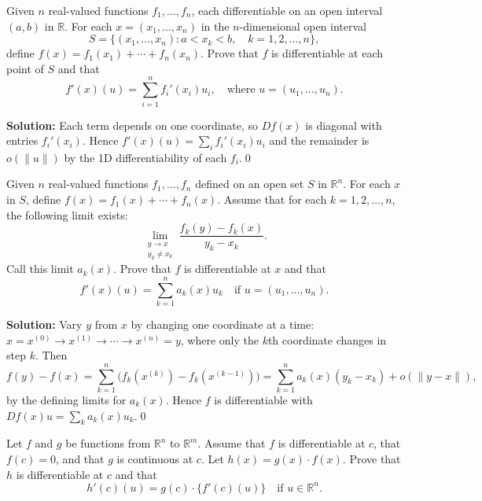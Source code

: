 \begin{problembox}
Given \( n \) real-valued functions \( f_1, \ldots, f_n \), each differentiable on an open interval \( (a, b) \) in \( \mathbb{R} \). For each \( x = (x_1, \ldots, x_n) \) in the \( n \)-dimensional open interval
\[S = \{(x_1, \ldots, x_n): a < x_k < b, \quad k = 1, 2, \ldots, n\},\]
define \( f(x) = f_1(x_1) + \cdots + f_n(x_n) \). Prove that \( f \) is differentiable at each point of \( S \) and that
\[f'(x)(u) = \sum_{i=1}^{n} f_i'(x_i)u_i, \quad \text{where } u = (u_1, \ldots, u_n).\]
\end{problembox}

\noindent\textbf{Solution:}
Each term depends on one coordinate, so $Df(x)$ is diagonal with entries $f_i'(x_i)$. Hence $f'(x)(u)=\sum_i f_i'(x_i)u_i$ and the remainder is $o(\|u\|)$ by the 1D differentiability of each $f_i$.\qed


\begin{problembox}
Given \( n \) real-valued functions \( f_1, \ldots, f_n \) defined on an open set \( S \) in \( \mathbb{R}^n \). For each \( x \) in \( S \), define \( f(x) = f_1(x) + \cdots + f_n(x) \). Assume that for each \( k = 1, 2, \ldots, n \), the following limit exists:
\[\lim_{\substack{y \to x \\ y_k \neq x_k}} \frac{f_k(y) - f_k(x)}{y_k - x_k}.\]
Call this limit \( a_k(x) \). Prove that \( f \) is differentiable at \( x \) and that
\[f'(x)(u) = \sum_{k=1}^{n} a_k(x) u_k \quad \text{if } u = (u_1, \ldots, u_n).\]
\end{problembox}

\noindent\textbf{Solution:}
Vary $y$ from $x$ by changing one coordinate at a time: $x=x^{(0)}\to x^{(1)}\to\cdots\to x^{(n)}=y$, where only the $k$th coordinate changes in step $k$. Then
\[f(y)-f(x)=\sum_{k=1}^n\big(f_k(x^{(k)})-f_k(x^{(k-1)})\big)=\sum_{k=1}^n a_k(x)(y_k-x_k)+o(\|y-x\|),\]
by the defining limits for $a_k(x)$. Hence $f$ is differentiable with $Df(x)u=\sum_k a_k(x)u_k$.\qed


\begin{problembox}
Let \( f \) and \( g \) be functions from \( \mathbb{R}^n \) to \( \mathbb{R}^m \). Assume that \( f \) is differentiable at \( c \), that \( f(c) = 0 \), and that \( g \) is continuous at \( c \). Let \( h(x) = g(x) \cdot f(x) \). Prove that \( h \) is differentiable at \( c \) and that
\[h'(c)(u) = g(c) \cdot \{f'(c)(u)\} \quad \text{if } u \in \mathbb{R}^n.\]
\end{problembox}

